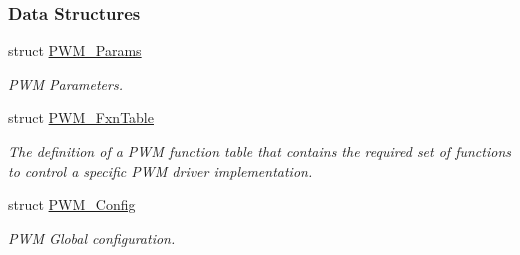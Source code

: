 \subsubsection*{Data Structures}
\begin{DoxyCompactItemize}
\item 
struct \hyperlink{struct_p_w_m___params}{P\+W\+M\+\_\+\+Params}
\begin{DoxyCompactList}\small\item\em P\+W\+M Parameters. \end{DoxyCompactList}\item 
struct \hyperlink{struct_p_w_m___fxn_table}{P\+W\+M\+\_\+\+Fxn\+Table}
\begin{DoxyCompactList}\small\item\em The definition of a P\+W\+M function table that contains the required set of functions to control a specific P\+W\+M driver implementation. \end{DoxyCompactList}\item 
struct \hyperlink{struct_p_w_m___config}{P\+W\+M\+\_\+\+Config}
\begin{DoxyCompactList}\small\item\em P\+W\+M Global configuration. \end{DoxyCompactList}\end{DoxyCompactItemize}
